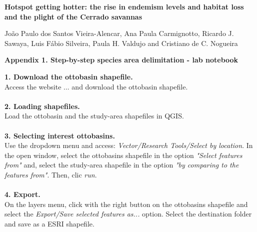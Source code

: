 \documentclass{article}
\begin{document}
\Large
\begin{center} 
\textbf{Hotspot getting hotter: the rise in endemism levels and habitat loss and the plight of the Cerrado savannas}
\end{center}

\normalsize
\begin{center}
João Paulo dos Santos Vieira-Alencar, Ana Paula Carmignotto, Ricardo J. Sawaya, Luis Fábio Silveira, Paula H. Valdujo and Cristiano de C. Nogueira
\end{center}

\large
\begin{center}
\textbf{Appendix 1. Step-by-step species area delimitation - lab notebook}
\end{center}
\noindent
\large{\textbf{1. Download the ottobasin shapefile.}}
\\
\normalsize
Access the website ... and download the ottobasin shapefile.
\\
\\
\large{\textbf{2. Loading shapefiles.}}
\\
\normalsize
Load the ottobasin and the study-area shapefiles in QGIS.
\\
\\
\large{\textbf{3. Selecting interest ottobasins.}}
\\
\normalsize
Use the dropdown menu and access: \textit{Vector/Research Tools/Select by location}. In the open window, select the ottobasins shapefile in the option \textit{"Select features from"} and, select the study-area shapefile in the option \textit{"by comparing to the features from"}. Then, clic \textit{run}.
\\
\\
\large{\textbf{4. Export.}}
\\
\normalsize
On the layers menu, click with the right button on the ottobasins shapefile and select the \textit{Export/Save selected features as...} option. Select the destination folder and save as a ESRI shapefile.
\\
\\
\end{document}
